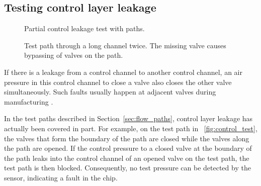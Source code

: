 \subsection{Testing control layer leakage}
\label{sec:control_layer_test}
\begin{figure}
{\figurefontsize
  \begin{minipage}[b]{0.20\textwidth}
    \centering
    
    \caption{Partial control leakage test with paths.}
    \label{fig:control_test}
  \end{minipage}
  \hspace{14pt}
  \begin{minipage}[b]{0.25\textwidth}
\centering

\caption{Test path through a long channel twice. The missing valve causes
bypassing of valves on the path. }
\label{fig:long_channel}
  \end{minipage}
}
\end{figure}

If there is a leakage from a control channel to another control channel,
an air pressure in this control channel 
to close a valve also closes the other valve simultaneously. 
Such faults usually happen at adjacent valves during manufacturing
\cite{HuYHC14}.
%
%

In the test paths described in Section~\ref{sec:flow_paths}, 
control layer leakage has actually been covered in part. For example, 
on the test path in \figname~\ref{fig:control_test}, the valves that
form the boundary of the path are closed while the valves along the path are
opened. If the control pressure to a closed valve at the boundary of the path 
leaks into the control channel of an opened valve on the test path, 
the test path is then blocked. Consequently, no test pressure 
can be detected by the sensor, indicating a fault in the chip. 

